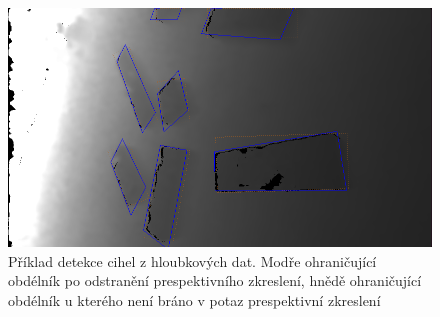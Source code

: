 \documentclass[twoside]{ctuthesis}
\begin{document}
\begin{figure}
    \centering
    \includegraphics[width = 0.7\linewidth]{pictures/detekce_bb.png}
    \caption[Příklad detekce cihel z hloubkových dat]{Příklad detekce cihel z hloubkových dat. Modře ohraničující obdélník po odstranění prespektivního zkreslení, hnědě ohraničující obdélník u kterého není bráno v potaz prespektivní zkreslení}
    \label{fig:bb_clasic}
\end{figure}
\end{document}
